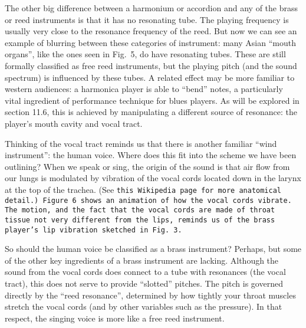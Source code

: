 
  The other big difference between a harmonium or accordion and any of the 
  brass or reed instruments is that it has no resonating tube. The playing 
  frequency is usually very close to the resonance frequency of the reed. But 
  now we can see an example of blurring between these categories of instrument: 
  many Asian “mouth organs”, like the ones seen in Fig.\ 5, do have resonating 
  tubes. These are still formally classified as free reed instruments, but the 
  playing pitch (and the sound spectrum) is influenced by these tubes. A 
  related effect may be more familiar to western audiences: a harmonica player 
  is able to “bend” notes, a particularly vital ingredient of performance 
  technique for blues players. As will be explored in section 11.6, this is 
  achieved by manipulating a different source of resonance: the player’s mouth 
  cavity and vocal tract. 


  Thinking of the vocal tract reminds us that there is another familiar “wind 
  instrument”: the human voice. Where does this fit into the scheme we have 
  been outlining? When we speak or sing, the origin of the sound is that air 
  flow from our lungs is modulated by vibration of the vocal cords located down 
  in the larynx at the top of the trachea. (See \tt{}this Wikipedia page\rm{} 
  for more anatomical detail.) Figure 6 shows an animation of how the vocal 
  cords vibrate. The motion, and the fact that the vocal cords are made of 
  throat tissue not very different from the lips, reminds us of the brass 
  player’s lip vibration sketched in Fig.\ 3. 

  So should the human voice be classified as a brass instrument? Perhaps, but 
  some of the other key ingredients of a brass instrument are lacking. Although 
  the sound from the vocal cords does connect to a tube with resonances (the 
  vocal tract), this does not serve to provide “slotted” pitches. The pitch is 
  governed directly by the “reed resonance”, determined by how tightly your 
  throat muscles stretch the vocal cords (and by other variables such as the 
  pressure). In that respect, the singing voice is more like a free reed 
  instrument. 

